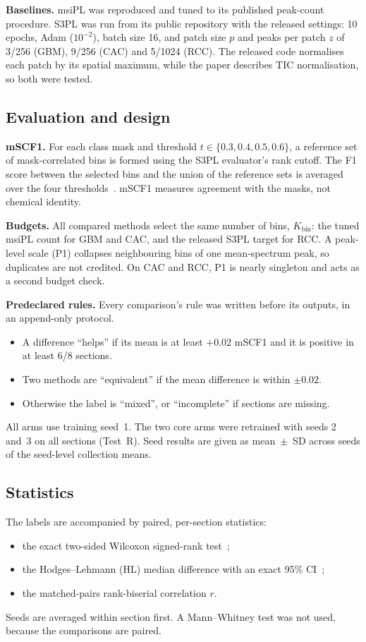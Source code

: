 \textbf{Baselines.} msiPL was reproduced and tuned to its published peak-count
procedure. S3PL was run from its public repository with the released settings:
10 epochs, Adam ($10^{-2}$), batch size 16, and patch size $p$ and peaks per
patch $z$ of 3/256 (GBM), 9/256 (CAC) and 5/1024 (RCC). The released code
normalises each patch by its spatial maximum, while the paper describes TIC
normalisation, so both were tested.

\subsection{Evaluation and design}
\label{sec:evaluation}
\textbf{mSCF1.} For each class mask and threshold
$t\in\{0.3,0.4,0.5,0.6\}$, a reference set of mask-correlated bins is formed
using the S3PL evaluator's rank cutoff. The F1 score between the selected bins
and the union of the reference sets is averaged over the four
thresholds~\citep{weigand2026spatial}. mSCF1 measures agreement with the
masks, not chemical identity.

\textbf{Budgets.} All compared methods select the same number of bins,
$K_{\text{bin}}$: the tuned msiPL count for GBM and CAC, and the released S3PL
target for RCC. A peak-level scale (P1) collapses neighbouring bins of one
mean-spectrum peak, so duplicates are not credited. On CAC and RCC, P1 is
nearly singleton and acts as a second budget check.

\textbf{Predeclared rules.} Every comparison's rule was written before its
outputs, in an append-only protocol.
\begin{itemize}
  \item A difference ``helps'' if its mean is at least $+0.02$ mSCF1 and it is
        positive in at least 6/8 sections.
  \item Two methods are ``equivalent'' if the mean difference is within
        $\pm0.02$.
  \item Otherwise the label is ``mixed'', or ``incomplete'' if sections are
        missing.
\end{itemize}
All arms use training seed~1. The two core arms were retrained with seeds 2
and~3 on all sections (Test~R). Seed results are given as mean~$\pm$~SD across
seeds of the seed-level collection means.

\subsection{Statistics}
\label{sec:stats}
The labels are accompanied by paired, per-section statistics:
\begin{itemize}
  \item the exact two-sided Wilcoxon signed-rank
        test~\citep{wilcoxon1945individual};
  \item the Hodges--Lehmann (HL) median difference with an exact 95\%
        CI~\citep{hodges1963estimates};
  \item the matched-pairs rank-biserial correlation $r$.
\end{itemize}
Seeds are averaged within section first. A Mann--Whitney test was not used,
because the comparisons are paired.

